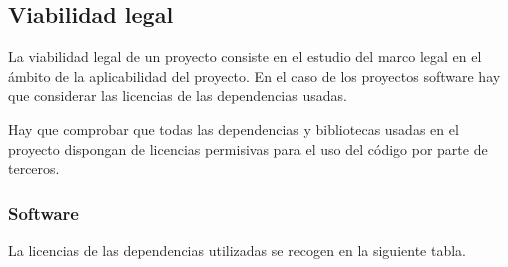 \subsection{Viabilidad legal}

La viabilidad legal de un proyecto consiste en el estudio del marco  legal en el ámbito de la aplicabilidad del proyecto. En el caso de los proyectos software hay que considerar las licencias de las dependencias usadas.

Hay que comprobar que todas las dependencias y bibliotecas usadas en el proyecto dispongan de licencias permisivas para el uso del código por parte de terceros.

\subsubsection{Software}

La licencias de las dependencias utilizadas se recogen en la siguiente tabla.



